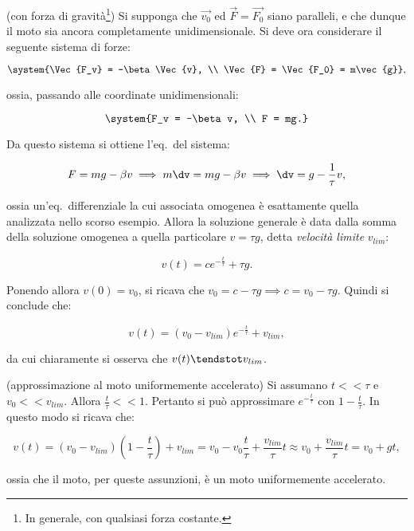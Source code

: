 \documentclass[11pt]{article}
\begin{document}
	\begin{example} (con forza di gravità\footnote{In generale,
			con qualsiasi forza costante.}) Si supponga che $\Vec{v_0}$
		ed $\Vec{F} = \Vec{F_0}$ siano paralleli, e che dunque il
		moto sia ancora completamente unidimensionale. 
		Si deve ora considerare il seguente sistema di forze:
		
		\[ \system{\Vec{F_v} = -\beta \Vec{v}, \\ \Vec{F} = \Vec{F_0} = m\vec{g}}, \]
		
		ossia, passando alle coordinate unidimensionali:
		
		\[ \system{F_v = -\beta v, \\ F = mg.} \]
		
		Da questo sistema si ottiene l'eq.~del sistema:
		
		\vskip 0.1in
		
		\[ F = mg - \beta v \implies m \dv = mg - \beta v \implies \dv = g - \frac{1}{\tau} v, \]
		
		ossia un'eq.~differenziale la cui associata omogenea è
		esattamente quella analizzata nello scorso esempio. Allora
		la soluzione generale è data dalla somma della soluzione
		omogenea a quella particolare $v = \tau g$, detta
		\textit{velocità limite} $v_{lim}$:
		
		\[ v(t) = c e^{-\frac{t}{\tau}} + \tau g. \]
		
		Ponendo allora $v(0) = v_0$, si ricava che $v_0 = c - \tau g \implies c = v_0 - \tau g$. Quindi si conclude che:
		
		\[ v(t) = (v_0 - v_{lim}) e^{-\frac{t}{\tau}} + v_{lim}, \]
		
		da cui chiaramente si osserva che $v(t) \tendstot v_{lim}$.
		
	\end{example}
	
	\begin{example} (approssimazione al moto uniformemente accelerato)
		Si assumano $t << \tau$ e $v_0 << v_{lim}$. Allora
		$\frac{t}{\tau} << 1$. Pertanto si può approssimare
		$e^{-\frac{t}{\tau}}$ con $1 - \frac{t}{\tau}$.
		In questo modo si ricava che:
		
		\[ v(t) = (v_0 - v_{lim})(1 - \frac{t}{\tau}) + v_{lim} =
		v_0 - v_0 \frac{t}{\tau} + \frac{v_{lim}}{\tau} t
		\approx v_0 + \frac{v_{lim}}{\tau} t = v_0 + gt,\]
		
		ossia che il moto, per queste assunzioni, è un moto
		uniformemente accelerato.
	\end{example}
	
\end{document}

